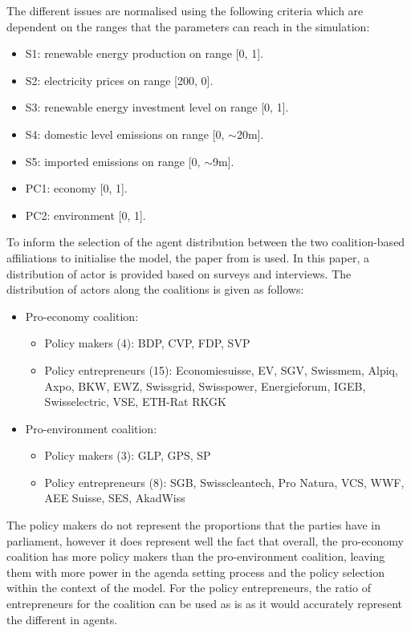 \documentclass[12pt]{article}
\begin{document}
The different issues are normalised using the following criteria which are dependent on the ranges that the parameters can reach in the simulation: 

\begin{itemize}
\item S1: renewable energy production on range [0, 1].
\item S2: electricity prices on range [200, 0]. %
\item S3: renewable energy investment level on range [0, 1].
\item S4: domestic level emissions on range [0, $\sim$20m].
\item S5: imported emissions on range [0, $\sim$9m]. %
\item PC1: economy [0, 1]. %
\item PC2: environment [0, 1]. %
\end{itemize}

To inform the selection of the agent distribution between the two coalition-based affiliations to initialise the model, the paper from \cite{markard2016socio} is used. In this paper, a distribution of actor is provided based on surveys and interviews. The distribution of actors along the coalitions is given as follows:

\begin{itemize}
\item Pro-economy coalition:
	\begin{itemize}
	\item Policy makers (4): BDP, CVP, FDP, SVP
	\item Policy entrepreneurs (15): Economiesuisse, EV, SGV, Swissmem, Alpiq, Axpo, BKW, EWZ, Swissgrid, Swisspower, Energieforum, IGEB, Swisselectric, VSE, ETH-Rat
RKGK
	\end{itemize}
\item Pro-environment coalition:
	\begin{itemize}
	\item Policy makers (3): GLP, GPS, SP
	\item Policy entrepreneurs (8): SGB, Swisscleantech, Pro Natura, VCS, WWF, AEE Suisse, SES, AkadWiss
	\end{itemize}
\end{itemize}

The policy makers do not represent the proportions that the parties have in parliament, however it does represent well the fact that overall, the pro-economy coalition has more policy makers than the pro-environment coalition, leaving them with more power in the agenda setting process and the policy selection within the context of the model. For the policy entrepreneurs, the ratio of entrepreneurs for the coalition can be used as is as it would accurately represent the different in agents.
\end{document}
